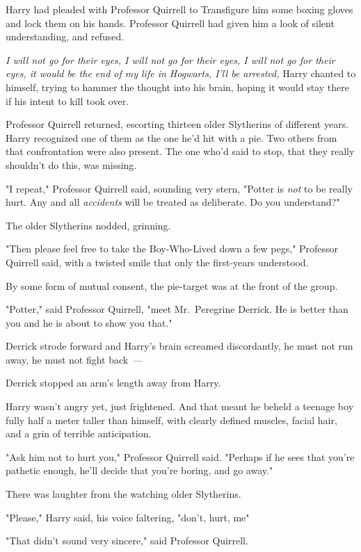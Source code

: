 Harry had pleaded with Professor Quirrell to Transfigure him some boxing gloves
and lock them on his hands. Professor Quirrell had given him a look of silent
understanding, and refused.

\emph{I will not go for their eyes, I will not go for their eyes, I will not go
for their eyes, it would be the end of my life in Hogwarts, I'll be arrested,}
Harry chanted to himself, trying to hammer the thought into his brain, hoping
it would stay there if his intent to kill took over.

Professor Quirrell returned, escorting thirteen older Slytherins of different
years. Harry recognized one of them as the one he'd hit with a pie. Two others
from that confrontation were also present. The one who'd said to stop, that
they really shouldn't do this, was missing.

"I repeat," Professor Quirrell said, sounding very stern, "Potter is \emph{not}
to be really hurt. Any and all \emph{accidents} will be treated as deliberate.
Do you understand?"

The older Slytherins nodded, grinning.

"Then please feel free to take the Boy-Who-Lived down a few pegs," Professor
Quirrell said, with a twisted smile that only the first-years understood.

By some form of mutual consent, the pie-target was at the front of the group.

"Potter," said Professor Quirrell, "meet Mr.~Peregrine Derrick. He is better
than you and he is about to show you that."

Derrick strode forward and Harry's brain screamed discordantly, he must not run
away, he must not fight back~---

Derrick stopped an arm's length away from Harry.

Harry wasn't angry yet, just frightened. And that meant he beheld a teenage boy
fully half a meter taller than himself, with clearly defined muscles, facial
hair, and a grin of terrible anticipation.

"Ask him not to hurt you," Professor Quirrell said. "Perhaps if he sees that
you're pathetic enough, he'll decide that you're boring, and go away."

There was laughter from the watching older Slytherins.

"Please," Harry said, his voice faltering, "don't, hurt, me{\el}"

"That didn't sound very sincere," said Professor Quirrell.


